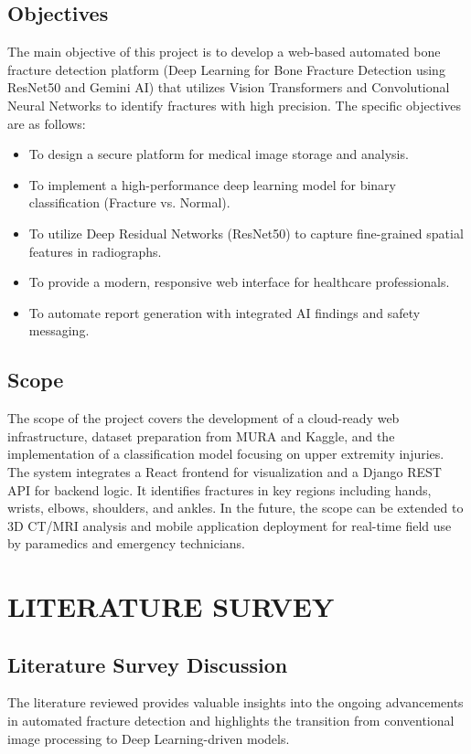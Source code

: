 \documentclass[a4paper,12pt]{report}
\begin{document}
    \section{Objectives}
    The main objective of this project is to develop a web-based automated bone fracture detection platform (Deep Learning for Bone Fracture Detection using ResNet50 and Gemini AI) that utilizes Vision Transformers and Convolutional Neural Networks to identify fractures with high precision. The specific objectives are as follows:
    \begin{itemize}[leftmargin=1.5cm]
        \item To design a secure platform for medical image storage and analysis.
        \item To implement a high-performance deep learning model for binary classification (Fracture vs. Normal).
        \item To utilize Deep Residual Networks (ResNet50) to capture fine-grained spatial features in radiographs.
        \item To provide a modern, responsive web interface for healthcare professionals.
        \item To automate report generation with integrated AI findings and safety messaging.
    \end{itemize}


    \section{Scope}
    The scope of the project covers the development of a cloud-ready web infrastructure, dataset preparation from MURA and Kaggle, and the implementation of a classification model focusing on upper extremity injuries. The system integrates a React frontend for visualization and a Django REST API for backend logic. It identifies fractures in key regions including hands, wrists, elbows, shoulders, and ankles. In the future, the scope can be extended to 3D CT/MRI analysis and mobile application deployment for real-time field use by paramedics and emergency technicians.


    \chapter{LITERATURE SURVEY}

    \section{Literature Survey Discussion}
    The literature reviewed provides valuable insights into the ongoing advancements in automated fracture detection and highlights the transition from conventional image processing to Deep Learning-driven models. 
\end{document}

